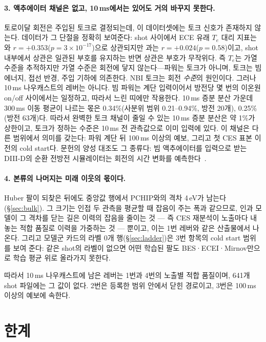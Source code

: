 \documentclass[10pt,a4paper]{article}
\begin{document}
\paragraph{3. 액추에이터 채널은 없고, 10\,ms에서는 있어도 거의 바꾸지 못한다.}
토로이달 회전은 주입된 토크로 결정되는데, 이 데이터셋에는 토크 신호가 존재하지
않는다. 데이터가 그 단절을 정확히 보여준다: shot 사이에서 ECE 유래 $T_e$ 대리
지표는 \Ti{}와 $r = +0.353$($p = 3\times10^{-17}$)으로 상관되지만 \Vrot{}과는
$r = +0.024$($p = 0.58$)이고, shot 내부에서 \Ti{} 상관은 일관된 부호를 유지하는
반면 \Vrot{} 상관은 부호가 무작위다. 즉 $T_e$는 가열 수준을 추적하지만 가열
수준은 회전에 닿지 않는다---파워는 토크가 아니며, 토크는 빔 에너지, 접선 반경,
주입 기하에 의존한다. NBI 토크는 회전 \emph{수준}의 원인이다. 그러나 10\,ms
나우캐스트의 레버는 아니다. 빔 파워는 계단 입력이어서 방전당 몇 번의 이온원 on/off
사이에서는 일정하고, 따라서 느린 띠에만 작용한다. 10\,ms 증분 분산 가운데 300\,ms
이동 평균이 나르는 몫은 \Vrot{} 0.34\%(사분위 범위 0.21--0.94\%, 방전 20개),
\Ti{} 0.25\%(방전 63개)다. 따라서 완벽한 토크 채널이 줄일 수 있는 10\,ms 증분
분산은 약 1\%가 상한이고, 토크가 정하는 수준은 10\,ms 전 관측값으로 이미 입력에
있다. 이 채널은 다른 범위에서 의미를 갖는다: 파워 계단 뒤 100\,ms 이상의 예보,
그리고 첫 CES 표본 이전의 cold start다. 문헌의 양성 대조도 그 종류다: 빔
액추에이터를 입력으로 받는 DIII-D의 순환 전방전 시뮬레이터는 회전의 시간 변화를
예측한다~\citep{Char2024FullShot}.

\paragraph{4. 본류의 나머지는 미래 이웃의 몫이다.}
Huber 팔이 되찾은 뒤에도 중앙값 행에서 PCHIP와의 격차 4\,eV가 남는다
(\S\ref{sec:bulk}). 그 크기는 인접 두 관측을 평균할 때 잡음이 주는 폭과 같으므로,
인과 모델이 그 격차를 닫는 길은 이력의 잡음을 줄이는 것 --- 즉 CES 재분석이
노출마다 내놓는 적합 품질로 이력을 가중하는 것 --- 뿐이고, 이는 1번 레버와 같은
산출물에서 나온다. 그리고 모델군 카드의 라벨 0개 행(\S\ref{sec:ladder})은 3번
항목의 cold start 범위를 보여 준다: 같은 shot의 \Vrot{} 라벨이 없으면 어떤 학습된
팔도 BES·ECEI·Mirnov만으로 학습 평균 위로 올라가지 못한다.

따라서 10\,ms 나우캐스트에 남은 레버는 1번과 4번의 노출별 적합 품질이며, 641개
shot 파일에는 그 값이 없다. 2번은 등록한 범위 안에서 닫힌 경로이고, 3번은 100\,ms
이상의 예보에 속한다.

\section{한계}
\label{sec:limits}
\end{document}
